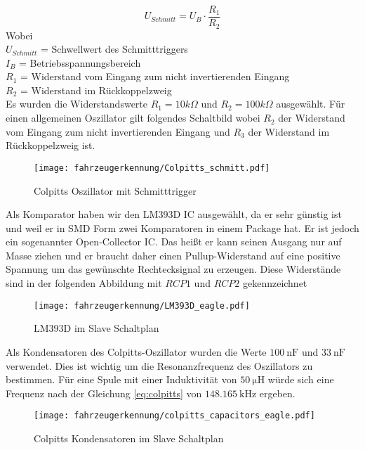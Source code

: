 \begin{equation} \label{eq:schmitt}
    U_{Schmitt} = U_{B} \cdot \frac{R_{1}}{R_{2}}
\end{equation}
Wobei \\
$U_{Schmitt}$ = Schwellwert des Schmitttriggers\\
$I_{B}$ = Betriebsspannungsbereich\\
$R_{1}$ = Widerstand vom Eingang zum nicht invertierenden Eingang\\
$R_{2}$ = Widerstand im Rückkoppelzweig\\

Es wurden die Widerstandswerte $R_{1} = 10k\Omega$ und $R_{2} = 100k\Omega$ ausgewählt. Für einen allgemeinen Oszillator gilt folgendes Schaltbild wobei $R_{2}$ der Widerstand vom Eingang zum nicht invertierenden Eingang und
$R_{3}$ der Widerstand im Rückkoppelzweig ist.

\begin{figure}[H]
    \centering
    \texttt{[image: fahrzeugerkennung/Colpitts\_schmitt.pdf]}
    \caption{Colpitts Oszillator mit Schmitttrigger}
\end{figure}

Als Komparator haben wir den LM393D IC ausgewählt, da er sehr günstig ist und weil er in SMD Form zwei Komparatoren in einem Package hat. Er ist jedoch ein sogenannter Open-Collector IC. Das heißt er kann seinen Ausgang nur auf Masse ziehen und er braucht daher 
einen Pullup-Widerstand auf eine positive Spannung um das gewünschte Rechtecksignal zu erzeugen. Diese Widerstände sind in der folgenden Abbildung mit $RCP1$ und $RCP2$ gekennzeichnet

\begin{figure}[H]
    \centering
    \texttt{[image: fahrzeugerkennung/LM393D\_eagle.pdf]}
    \caption{LM393D im Slave Schaltplan}
\end{figure}

Als Kondensatoren des Colpitts-Oszillator wurden die Werte $\SI{100}{\nano\farad}$ und $\SI{33}{\nano\farad}$ verwendet. Dies ist wichtig um die Resonanzfrequenz des Oszillators zu bestimmen.
Für eine Spule mit einer Induktivität von $\SI{50}{\micro\henry}$ würde sich eine Frequenz nach der Gleichung \ref{eq:colpitts} von $\SI{148,165}{\kilo\hertz}$ ergeben. 

\begin{figure}[H]
    \centering
    \texttt{[image: fahrzeugerkennung/colpitts\_capacitors\_eagle.pdf]}
    \caption{Colpitts Kondensatoren im Slave Schaltplan}
\end{figure}

